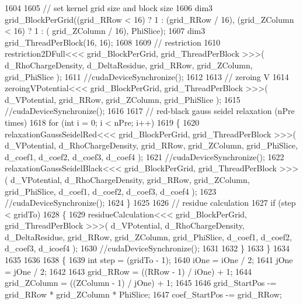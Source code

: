 \begin{DoxyCode}
1604 
1605             \textcolor{comment}{// set kernel grid size and block size}
1606             dim3 grid\_BlockPerGrid((grid\_RRow < 16) ? 1 : (grid\_RRow / 16), (grid\_ZColumn < 16) ? 1 : (
      grid\_ZColumn / 16), PhiSlice);
1607             dim3 grid\_ThreadPerBlock(16, 16);
1608 
1609             \textcolor{comment}{// restriction}
1610             restriction2DFull<<< grid\_BlockPerGrid, grid\_ThreadPerBlock >>>( d\_RhoChargeDensity, 
      d\_DeltaResidue, grid\_RRow, grid\_ZColumn, grid\_PhiSlice );
1611             \textcolor{comment}{//cudaDeviceSynchronize();}
1612 
1613             \textcolor{comment}{// zeroing V}
1614             zeroingVPotential<<< grid\_BlockPerGrid, grid\_ThreadPerBlock >>>( d\_VPotential, grid\_RRow, 
      grid\_ZColumn, grid\_PhiSlice );
1615             \textcolor{comment}{//cudaDeviceSynchronize();}
1616 
1617             \textcolor{comment}{// red-black gauss seidel relaxation (nPre times)}
1618             \textcolor{keywordflow}{for} (\textcolor{keywordtype}{int} i = 0; i < nPre; i++)
1619             \{
1620                 relaxationGaussSeidelRed<<< grid\_BlockPerGrid, grid\_ThreadPerBlock >>>( d\_VPotential, 
      d\_RhoChargeDensity, grid\_RRow, grid\_ZColumn, grid\_PhiSlice, d\_coef1, d\_coef2, d\_coef3, d\_coef4 );
1621                 \textcolor{comment}{//cudaDeviceSynchronize();}
1622                 relaxationGaussSeidelBlack<<< grid\_BlockPerGrid, grid\_ThreadPerBlock >>>( d\_VPotential, 
      d\_RhoChargeDensity, grid\_RRow, grid\_ZColumn, grid\_PhiSlice, d\_coef1, d\_coef2, d\_coef3, d\_coef4 );
1623                 \textcolor{comment}{//cudaDeviceSynchronize();}
1624             \}
1625 
1626             \textcolor{comment}{// residue calculation}
1627             \textcolor{keywordflow}{if} (step < gridTo)
1628             \{
1629                 residueCalculation<<< grid\_BlockPerGrid, grid\_ThreadPerBlock >>>( d\_VPotential, 
      d\_RhoChargeDensity, d\_DeltaResidue, grid\_RRow, grid\_ZColumn, grid\_PhiSlice, d\_coef1, d\_coef2, d\_coef3, d\_icoef4 );
1630                 \textcolor{comment}{//cudaDeviceSynchronize();}
1631 
1632             \}
1633         \}
1634 
1635         
1636 
1638         \{
1639             \textcolor{keywordtype}{int} step = (gridTo - 1);
1640             iOne = iOne / 2;
1641             jOne = jOne / 2;
1642         
1643             grid\_RRow       = ((RRow - 1) / iOne) + 1;
1644             grid\_ZColumn    = ((ZColumn - 1) / jOne) + 1;
1645 
1646             grid\_StartPos -= grid\_RRow * grid\_ZColumn * PhiSlice;
1647             coef\_StartPos -= grid\_RRow;

\end{DoxyCode}
